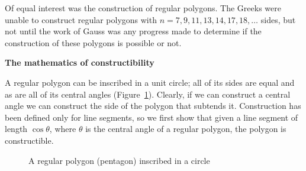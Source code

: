 \documentclass[a4paper,11pt]{article}
\begin{document}
Of equal interest was the construction of regular polygons. The Greeks were unable to construct regular polygons with $n=7,9,11,13,14,17,18,\ldots$ sides, but not until the work of Gauss was any progress made to determine if the construction of these polygons is possible or not.

\textbf{The mathematics of constructibility}

A regular polygon can be inscribed in a unit circle; all of its sides are equal and as are all of its central angles (Figure~\ref{fig.pentagon}). Clearly, if we can construct a central angle we can construct the side of the polygon that subtends it. Construction has been defined only for line segments, so we first show that given a line segment of length $\cos \theta$, where $\theta$ is the central angle of a regular polygon, the polygon is constructible. 
\begin{figure}[htb]
\begin{center}
\caption{A regular polygon (pentagon) inscribed in a circle}\label{fig.pentagon}
\end{center}
\end{figure}
\end{document}
